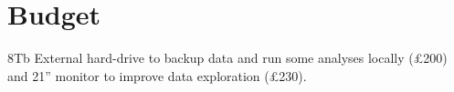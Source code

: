 \documentclass[11pt]{article}
\begin{document}
\begin{linenumbers}
\begin{table}[ht!]
\begin{center}
\begin{tabular}{l||c|c|c|c|c|c}
        \end{tabular}
        \end{center}
        \label{table: Akaike and Schwarz weights}
    \end{table}
    
    \section{Budget}
    
    8Tb External hard-drive to backup data and run some analyses locally (£200) and 21” monitor to improve data exploration (£230).

    
    

    \end{linenumbers}    
\end{document}
